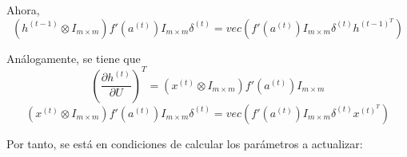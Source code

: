 \documentclass[12pt,twoside]{article}
\begin{document}
Ahora, 
\begin{equation}
(h^{(t-1)} \otimes I_{m \times m}) f'(a^{(t)}) I_{m \times m}\delta^{(t)} = vec(f'(a^{(t)}) I_{m \times m}\delta^{(t)}h^{(t-1)^T})
\end{equation}

Análogamente, se tiene que
\begin{equation}
\left( \frac{\partial h^{(t)}}{\partial U} \right)^T = (x^{(t)} \otimes I_{m \times m}) f'(a^{(t)}) I_{m \times m}
\end{equation}
\begin{equation}
(x^{(t)} \otimes I_{m \times m}) f'(a^{(t)}) I_{m \times m}\delta^{(t)} = vec(f'(a^{(t)}) I_{m \times m}\delta^{(t)}x^{(t)^T})
\end{equation}




Por tanto, se está en condiciones de calcular los parámetros a actualizar: 
\end{document}
